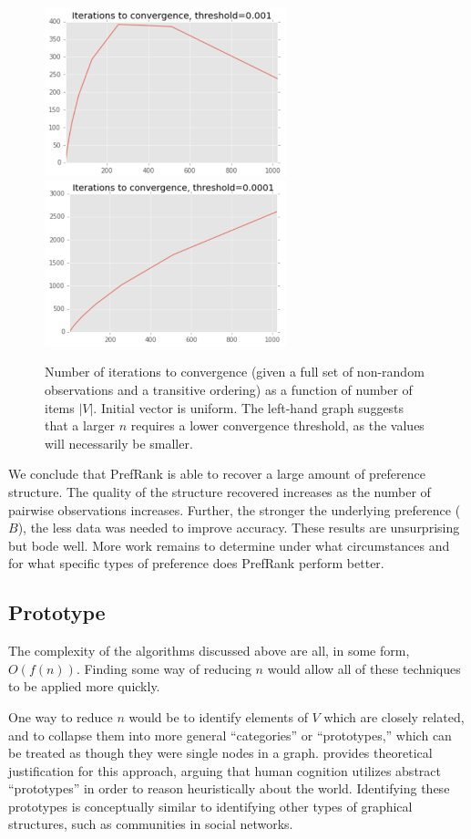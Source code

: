 \begin{figure}[!htb]
\includegraphics[width=	7cm]{images/pr_iter_001}
\hfill
\includegraphics[width=7cm]{images/pr_iter_0001}
\caption{Number of iterations to convergence (given a full set of non-random observations and a transitive ordering) as a function of number of items $|V|$. Initial vector is uniform. The left-hand graph suggests that a larger $n$ requires a lower convergence threshold, as the values will necessarily be smaller.}
\label{fig:pr_1} 
\end{figure}

We conclude that PrefRank is able to recover a large amount of preference structure.
The quality of the structure recovered increases as the number of pairwise observations increases.
Further, the stronger the underlying preference ($B$), the less data was needed to improve accuracy.
These results are unsurprising but bode well.
More work remains to determine under what circumstances and for what specific types of preference does PrefRank perform better.

\subsection{Prototype}

The complexity of the algorithms discussed above are all, in some form, $O(f(n))$.
Finding some way of reducing $n$ would allow all of these techniques to be applied more quickly.

\bigskip

One way to reduce $n$ would be to identify elements of $V$ which are closely related, and to collapse them into more general ``categories'' or ``prototypes,'' which can be treated as though they were single nodes in a graph.
\citet{rosch:1973} provides theoretical justification for this approach, arguing that human cognition utilizes abstract ``prototypes'' in order to reason heuristically about the world.
Identifying these prototypes is conceptually similar to identifying other types of graphical structures, such as communities in social networks.

